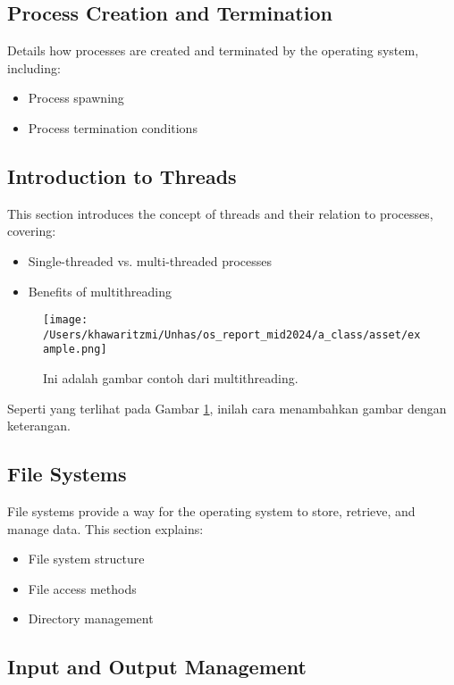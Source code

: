 \documentclass[12pt]{article}
\begin{document}
\subsection{Process Creation and Termination}
Details how processes are created and terminated by the operating system, including:
\begin{itemize}
    \item Process spawning
    \item Process termination conditions
\end{itemize}

\subsection{Introduction to Threads}
This section introduces the concept of threads and their relation to processes, covering:
\begin{itemize}
    \item Single-threaded vs. multi-threaded processes
    \item Benefits of multithreading
\end{itemize}

\begin{figure}[h]
    \centering
    \texttt{[image: /Users/khawaritzmi/Unhas/os\_report\_mid2024/a\_class/asset/example.png]}  %
    \caption{Ini adalah gambar contoh dari multithreading.}
    \label{fig:contoh_gambar}
\end{figure}

Seperti yang terlihat pada Gambar \ref{fig:contoh_gambar}, inilah cara menambahkan gambar dengan keterangan.

\subsection{File Systems}
File systems provide a way for the operating system to store, retrieve, and manage data. This section explains:
\begin{itemize}
    \item File system structure
    \item File access methods
    \item Directory management
\end{itemize}

\setlength{\parindent}{0pt}

\subsection{Input and Output Management}
\end{document}
